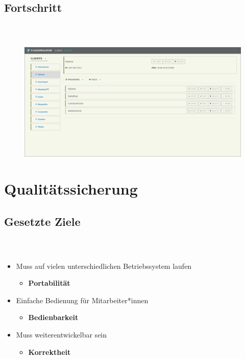 \documentclass[accentcolor=tud1b,colorbacktitle,landscape,german,presentation]{tudbeamer}
\newcommand{\ftitle}{
	\frametitle{\insertsectionhead \\ {\small \insertsubsectionhead}}
}
\begin{document}
\subsection{Fortschritt}
\begin{frame}
	\ftitle
	\vspace{-0.8cm}
	\begin{figure}
		\includegraphics[scale=0.24]{interface}
	\end{figure}

\end{frame}

\section{Qualitätssicherung}
\subsection{Gesetzte Ziele}
\begin{frame}
	\ftitle
	\begin{itemize}
		\item Muss auf vielen unterschiedlichen Betriebssystem laufen
			\begin{itemize}
				\item <2->\textbf{Portabilität}
			\end{itemize}
		\item Einfache Bedienung für Mitarbeiter*innen
			\begin{itemize}
				\item <3->\textbf{Bedienbarkeit}
			\end{itemize}
		\item Muss weiterentwickelbar sein
			\begin{itemize}
				\item <4->\textbf{Korrektheit}
			\end{itemize}
	\end{itemize}

\end{frame}
\end{document}
